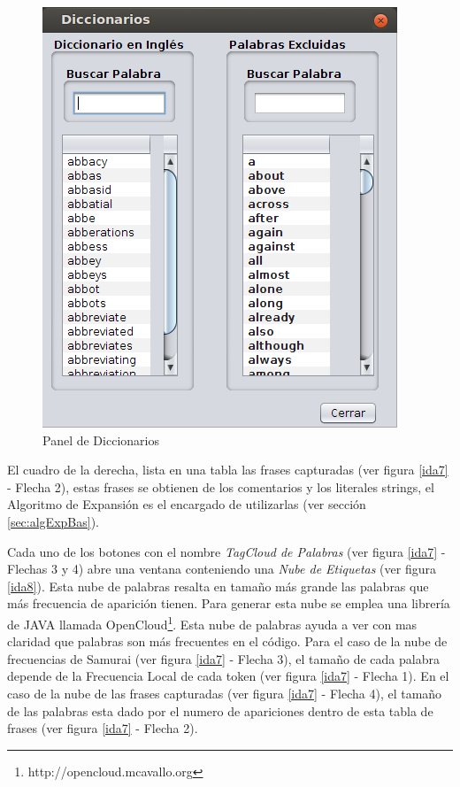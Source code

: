 \begin{figure}[t] %
\centerline{%
\includegraphics[scale= 0.6]{./cap4/ida_09.png}
}
\caption{Panel de Diccionarios}
\label{ida9}
\end{figure}

El cuadro de la derecha, lista en una tabla las frases capturadas (ver figura \ref{ida7} - Flecha 2), estas frases se obtienen de los comentarios y los literales strings, el Algoritmo de Expansión es el encargado de utilizarlas (ver sección \ref{sec:algExpBas}).

Cada uno de los botones con el nombre \textit{TagCloud de Palabras} (ver figura \ref{ida7} - Flechas 3 y 4) abre una ventana conteniendo una \textit{Nube de Etiquetas} (ver figura \ref{ida8}). Esta nube de palabras resalta en tamaño más grande las palabras que más frecuencia de aparición tienen. Para generar esta nube se emplea una librería de JAVA llamada OpenCloud\footnote[1]{http://opencloud.mcavallo.org}.
Esta nube de palabras ayuda a ver con mas claridad que palabras son más frecuentes en el código. Para el caso de la nube de frecuencias de Samurai (ver figura \ref{ida7} - Flecha 3), el tamaño de cada palabra depende de la Frecuencia Local de cada token (ver figura \ref{ida7} - Flecha 1). En el caso de la nube de las frases capturadas (ver figura \ref{ida7} - Flecha 4), el tamaño de las palabras esta dado por el numero de apariciones dentro de esta tabla de frases (ver figura \ref{ida7} - Flecha 2).

